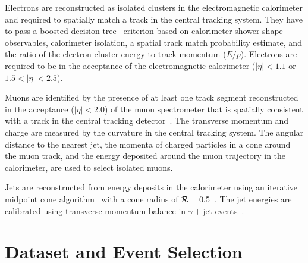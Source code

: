 \documentclass[aps,prd,twocolumn,showpacs,superscriptaddress,groupedaddress,floatfix]{revtex4}
\begin{document}
Electrons are reconstructed as isolated clusters in the electromagnetic calorimeter
and required to spatially match a track
in the central tracking system.  
They have to pass a boosted decision tree~\cite{NIM_emid}
criterion based on calorimeter shower shape observables, calorimeter isolation,
a spatial track match probability estimate, and the ratio of the electron cluster energy to track momentum ($E/p$).
Electrons are required to be in the acceptance
of the electromagnetic calorimeter ($|\eta|<1.1$ or $1.5<|\eta|<2.5$).




Muons are identified by the presence of at least one track segment
reconstructed in the acceptance ($|\eta| < 2.0$) of the muon spectrometer that is spatially consistent
with a track in the central tracking detector~\cite{NIM_muonid}. The transverse momentum and charge are
measured by the curvature in the central tracking system.
The angular distance to the nearest jet, 
the momenta of charged particles in a cone around the muon track,
and the energy deposited around the muon trajectory in the calorimeter, are
used to select isolated muons.



Jets are reconstructed from energy deposits in the calorimeter using
an iterative midpoint cone algorithm~\cite{Blazey:2000qt} with a cone radius of ${\cal R}= 0.5$~\cite{Note2}. The jet energies are calibrated using transverse momentum balance in $\gamma+$jet
events~\cite{Abazov:2013hda}.




\section{Dataset and Event Selection}
\label{sec:selection}
\end{document}
